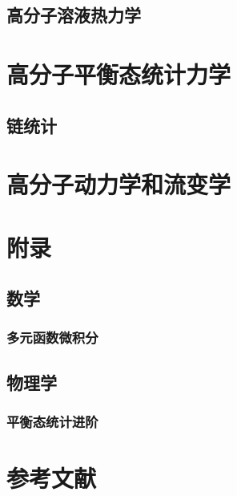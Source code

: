 \documentclass[zihao=5,linespread=1.3,a4paper,heading=true,twoside]{ctexbook}
\theoremstyle{definition}
\theoremstyle{plain}
\begin{document}
\chapter{高分子溶液热力学}

\part{高分子平衡态统计力学}
\chapter{链统计}
\part{高分子动力学和流变学}

\part{附录}
\chapter{数学}
\section{多元函数微积分}

\chapter{物理学}
\section{平衡态统计进阶}


\newpage\part*{参考文献}
\printbibliography[heading=none]
\end{document}
